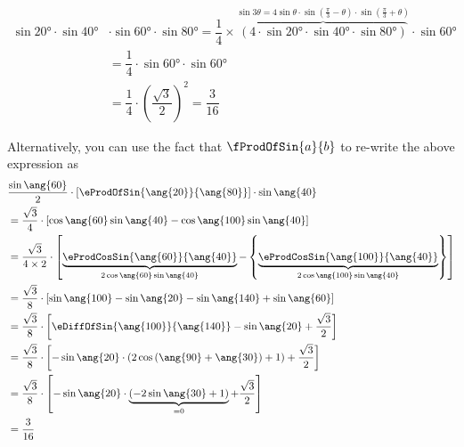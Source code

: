 \begin{solution}[\halfpage]
	\begin{fullwidth}
    \begin{align}
       \sin\ang{20}\cdot\sin\ang{40}&\cdot\sin\ang{60}\cdot\sin\ang{80} = 
       \dfrac{1}{4}\times\overbrace{(4\cdot\sin\ang{20}\cdot\sin\ang{40}\cdot\sin\ang{80})}
       ^{\sin 3\theta = 4\sin\theta\cdot\sin\left( \frac{\pi}{3} - \theta\right)\cdot\sin\left(\frac{\pi}{3} +
        \theta\right)}\cdot\sin\ang{60} \\
       &= \dfrac{1}{4}\cdot\sin\ang{60}\cdot\sin\ang{60} \\
       &= \dfrac{1}{4}\cdot\left(\dfrac{\sqrt{3}}{2} \right)^2 = \dfrac{3}{16}
    \end{align}
    
    Alternatively, you can use the fact that $\fProdOfSin{a}{b}$ to re-write the above expression as
    \begin{align}
    	&\dfrac{\sin\ang{60}}{2}\cdot\left[ \eProdOfSin{\ang{20}}{\ang{80}}\right]\cdot\sin\ang{40} \\
    	&= \dfrac{\sqrt{3}}{4}\cdot\left[ \cos\ang{60}\sin\ang{40} - \cos\ang{100}\sin\ang{40}\right] \\
    	&= \dfrac{\sqrt{3}}{4\times 2}\cdot\left[ \underbrace{\eProdCosSin{\ang{60}}{\ang{40}}}_{2\cos{\ang{60}}\sin{\ang{40}}} - 
       \left\lbrace\underbrace{\eProdCosSin{\ang{100}}{\ang{40}}}_{2\cos{\ang{100}}\sin{\ang{40}}}\right\rbrace\right] \\
    	&= \dfrac{\sqrt{3}}{8}\cdot\left[ \sin\ang{100}-\sin\ang{20}-\sin\ang{140} + \sin\ang{60} \right] \\
    	&= \dfrac{\sqrt{3}}{8}\cdot\left[ \eDiffOfSin{\ang{100}}{\ang{140}} - \sin\ang{20} + \dfrac{\sqrt{3}}{2} \right]\\
    	&= \dfrac{\sqrt{3}}{8}\cdot\left[ -\sin\ang{20}\cdot(2\cos{(\ang{90} + \ang{30})} + 1) 
    	+ \dfrac{\sqrt{3}}{2} \right] \\
    	&= \dfrac{\sqrt{3}}{8}\cdot\left[ -\sin\ang{20}\cdot\underbrace{(-2\sin\ang{30} + 1)}_{ = 0 } 
    	+ \dfrac{\sqrt{3}}{2} \right] \\
    	&= \dfrac{3}{16}
    \end{align}
    \end{fullwidth}
\end{solution}
